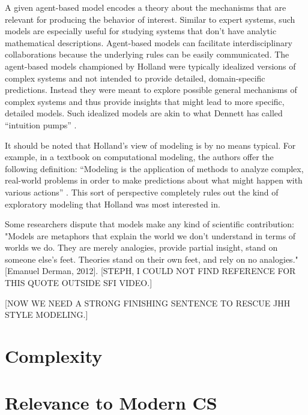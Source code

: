 \documentclass{sig-alternate}
\begin{document}
A given agent-based model encodes a theory about the mechanisms that
are relevant for producing the behavior of interest.  Similar to
expert systems, such models are especially useful for studying systems
that don't have analytic mathematical descriptions.  Agent-based
models can facilitate interdisciplinary collaborations because the
underlying rules can be easily communicated.  The agent-based models
championed by Holland were typically idealized versions of complex
systems and not intended to provide detailed, domain-specific
predictions.  Instead they were meant to explore possible general
mechanisms of complex systems and thus provide insights that might
lead to more specific, detailed models.  Such idealized models are
akin to what Dennett has called ``intuition pumps''
\cite{Dennett1984}.

It should be noted that Holland's view of modeling is by no means
typical.  For example, in a textbook on computational modeling, the
authors offer the following definition: “Modeling is the application
of methods to analyze complex, real-world problems in order to make
predictions about what might happen with various actions”
\cite{Shiflet2014}.   This sort of perspective completely rules out the
kind of exploratory modeling that Holland was most interested in. 

Some researchers dispute that models make any kind of scientific
contribution: "Models are metaphors that explain the world we don't
understand in terms of worlds we do.  They are merely analogies,
provide partial insight, stand on someone else's feet.  Theories stand
on their own feet, and rely on no analogies."  [Emanuel Derman, 2012].
[STEPH, I COULD NOT FIND REFERENCE FOR THIS QUOTE OUTSIDE SFI VIDEO.]

[NOW WE NEED A STRONG FINISHING SENTENCE TO RESCUE JHH STYLE
  MODELING.]

\section{Complexity}

\section{Relevance to Modern CS}
\end{document}
